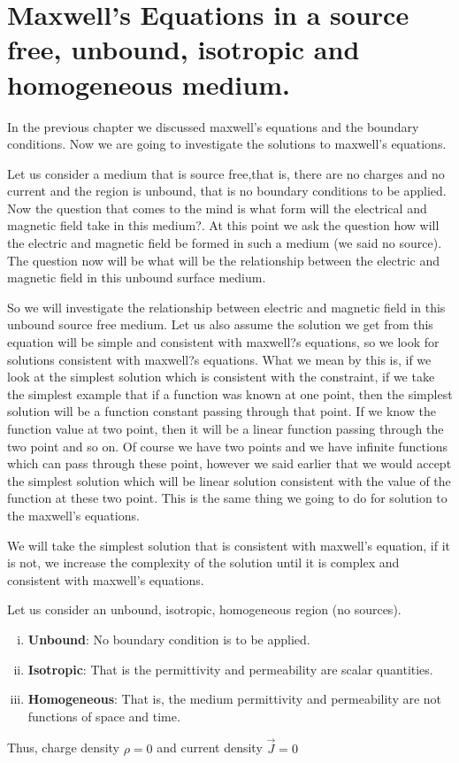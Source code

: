 \chapter{Maxwell's Equations in a source free, unbound, isotropic and homogeneous medium.}

In the previous chapter we discussed maxwell's equations and the boundary conditions. Now we are going to investigate the solutions to maxwell's equations.

Let us consider a medium that is source free,that is, there are no charges and no current and the region is unbound, that is no boundary conditions to be applied. Now the question that comes to the mind is what form will the electrical and magnetic field take in this medium?. At this point we ask the question how will the electric and magnetic field be formed in such a medium (we said no source). The question now will be what will be the relationship between the electric and magnetic field in this unbound surface medium.

So we will investigate the relationship between electric and magnetic field in this unbound source free medium. Let us also assume the solution we get from this equation will be simple and consistent with maxwell?s equations, so we look for solutions consistent with maxwell?s  equations. What we mean by this is, if we look at the simplest solution which is consistent with the constraint, if we take the simplest example that if a function was known at one point, then the simplest solution will be a function constant passing through that point. If we know the function value at two point, then it will be a linear function passing through the two point and so on. Of course we have two points and we have infinite functions which can pass through these point, however we said earlier that we would accept the simplest solution which will be linear solution consistent with the value of the function at these two point. This is the same thing we going to do for solution to the maxwell's equations. 

We will take the simplest solution that is consistent with maxwell's equation, if it is not, we increase the complexity of the solution until it is complex and consistent with maxwell's equations.

Let us consider an unbound, isotropic, homogeneous region (no sources).
\begin{enumerate}[(i)]
\item \textbf{Unbound}: No boundary condition is to be applied.
\item \textbf{Isotropic}: That is the permittivity and permeability are scalar quantities.
\item \textbf{Homogeneous}: That is, the medium permittivity and permeability are not functions of space and time. 
\end{enumerate}
Thus, charge density $\rho=0$ and current density $\vec{J}=0$

